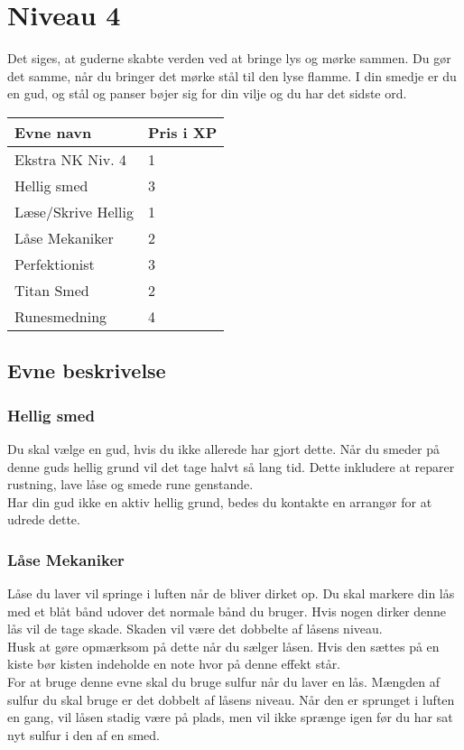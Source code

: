 \chapter{Niveau 4}
Det siges, at guderne skabte verden ved at bringe lys og mørke sammen. Du gør det samme, når du bringer det mørke stål til den lyse flamme. I din smedje er du en gud, og stål og panser bøjer sig for din vilje og du har det sidste ord.\\


\begin{tabular}{|p{}|p{}|}
\hline
\rowcolor{cerulean!40}
    Evne navn & Pris i XP\\ \hline
    Ekstra NK Niv. 4 & 1\\\hline
    Hellig smed & 3 \\\hline
    Læse/Skrive Hellig  & 1\\\hline
    Låse Mekaniker & 2 \\\hline
    Perfektionist & 3 \\\hline
    Titan Smed & 2 \\\hline
    Runesmedning   & 4\\\hline
\end{tabular}

\section{Evne beskrivelse}



\subsection{Hellig smed}
Du skal vælge en gud, hvis du ikke allerede har gjort dette. Når du smeder på denne guds hellig grund vil det tage halvt så lang tid. Dette inkludere at reparer rustning, lave låse og smede rune genstande.\\
Har din gud ikke en aktiv hellig grund, bedes du kontakte en arrangør for at udrede dette.



\subsection{Låse Mekaniker}
Låse du laver vil springe i luften når de bliver dirket op. Du skal markere din lås med et blåt bånd udover det normale bånd du bruger. Hvis nogen dirker denne lås vil de tage skade. Skaden vil være det dobbelte af låsens niveau.\\
Husk at gøre opmærksom på dette når du sælger låsen. Hvis den sættes på en kiste bør kisten indeholde en note hvor på denne effekt står.\\
For at bruge denne evne skal du bruge sulfur når du laver en lås. Mængden af sulfur du skal bruge er det dobbelt af låsens niveau. Når den er sprunget i luften en gang, vil låsen stadig være på plads, men vil ikke sprænge igen før du har sat nyt sulfur i den af en smed.

